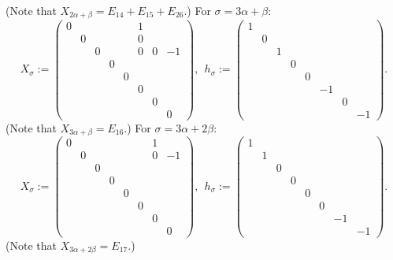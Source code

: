 \documentclass[12pt,letterpaper]{amsart}
\theoremstyle{plain}
\theoremstyle{definition}
\theoremstyle{remark}
\theoremstyle{definition}
\begin{document}
(Note that $X_{2\alpha + \beta} = E_{14}+E_{15}+E_{26}$.) For
$\sigma = 3\alpha+\beta$:
\[
X_{\sigma} :=
\begin{pmatrix} 0& & & & &1& & \\
          &0& & & &0& & \\
          & &0& & &0&0&-1\\
          & & &0& & & & \\
          & & & &0& & & \\
          & & & & &0& & \\
          & & & & & &0& \\
          & & & & & & &0
         \end{pmatrix},\ \
h_{\sigma} := \begin{pmatrix} 1& & & & & & & \\
                          &0& & & & & & \\
                          & &1& & & & & \\
                          & & &0& & & & \\
                          & & & &0& & & \\
                          & & & & &-1& & \\
                          & & & & & &0& \\
                          & & & & & & &-1
                         \end{pmatrix}.
\]
(Note that $X_{3\alpha + \beta} = E_{16}$.) For $\sigma =
3\alpha+2\beta$:
\[
X_{\sigma} :=
\begin{pmatrix} 0& & & & & &1& \\
          &0& & & & &0&-1\\
          & &0& & & & & \\
          & & &0& & & & \\
          & & & &0& & & \\
          & & & & &0& & \\
          & & & & & &0& \\
          & & & & & & &0
         \end{pmatrix},\ \
h_{\sigma} := \begin{pmatrix} 1& & & & & & & \\
                          &1& & & & & & \\
                          & &0& & & & & \\
                          & & &0& & & & \\
                          & & & &0& & & \\
                          & & & & &0& & \\
                          & & & & & &-1& \\
                          & & & & & & &-1
                         \end{pmatrix}.
\]
(Note that $X_{3\alpha+2\beta} = E_{17}$.)
\end{document}
